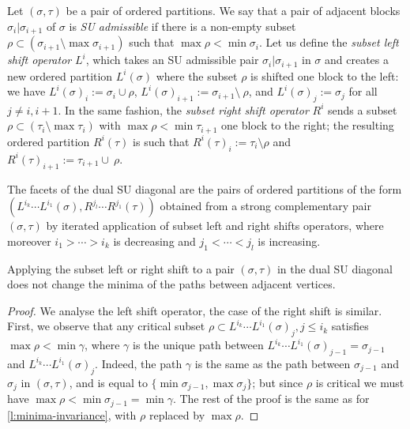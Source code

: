 Let $(\sigma,\tau)$ be a pair of ordered partitions.
We say that a pair of adjacent blocks $\sigma_i | \sigma_{i+1}$ of $\sigma$ is \emph{SU admissible} if there is a non-empty subset $\rho \subset (\sigma_{i+1} \setminus \max\sigma_{i+1})$ such that $\max \rho < \min \sigma_{i}$. 
Let us define the \emph{subset left shift operator} $L^i$, which takes an SU admissible pair $\sigma_i | \sigma_{i+1}$ in $\sigma$ and creates a new ordered partition $L^i(\sigma)$ where the subset $\rho$ is shifted one block to the left: we have $L^i(\sigma)_i := \sigma_i \cup \rho$, $L^i(\sigma)_{i+1} := \sigma_{i+1} \setminus \ \rho$, and $L^i(\sigma)_{j}:=\sigma_j$ for all $j\neq i, i+1$. 
In the same fashion, the \emph{subset right shift operator} $R^i$ sends a subset $\rho \subset (\tau_{i} \setminus \max\tau_{i})$ with $\max \rho < \min \tau_{i+1}$ one block to the right; the resulting ordered partition $R^i(\tau)$ is such that $R^i(\tau)_i := \tau_i \setminus \rho$ and $R^i(\tau)_{i+1} := \tau_{i+1} \cup \ \rho$.


\begin{definition}\label{def: Dual SU diagonal, second definition}
    The facets of the dual SU diagonal are the pairs of ordered partitions of the form $(L^{i_k}\cdots L^{i_1}(\sigma), R^{j_l}\cdots R^{j_1}(\tau))$ obtained from a strong complementary pair $(\sigma,\tau)$ by iterated application of subset left and right shifts operators, where moreover $i_1 > \cdots > i_k$ is decreasing and $j_1 < \cdots < j_l$ is increasing. 
\end{definition}

\begin{lemma}
\label{l:minima-invariance-subset}
    Applying the subset left or right shift to a pair $(\sigma,\tau)$ in the dual SU diagonal does not change the minima of the paths between adjacent vertices. 
\end{lemma}

\begin{proof}
    We analyse the left shift operator, the case of the right shift is similar. 
    First, we observe that any critical subset $\rho \subset L^{i_k}\cdots L^{i_1}(\sigma)_j, j \leq i_k$ satisfies $\max \rho < \min \gamma$, where $\gamma$ is the unique path between $L^{i_k}\cdots L^{i_1}(\sigma)_{j-1}=\sigma_{j-1}$ and $L^{i_k}\cdots L^{i_1}(\sigma)_j$. 
    Indeed, the path $\gamma$ is the same as the path between $\sigma_{j-1}$ and $\sigma_{j}$ in $(\sigma,\tau)$, and is equal to $\{\min \sigma_{j-1}, \max \sigma_j\}$; but since $\rho$ is critical we must have $\max \rho < \min \sigma_{j-1}=\min \gamma$. 
    The rest of the proof is the same as for \cref{l:minima-invariance}, with $\rho$ replaced by $\max \rho$. 
\end{proof}


